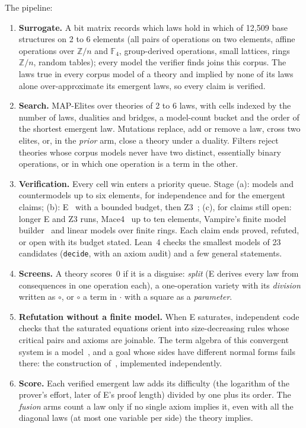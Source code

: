 \documentclass[11pt]{article}
\newcommand{\op}{\cdot}
\newcommand{\cop}{\circ}
\newenvironment{steps}{\begin{enumerate}\setlength{\itemsep}{2pt}\setlength{\parsep}{0pt}\setlength{\topsep}{3pt}}{\end{enumerate}}
\begin{document}
The pipeline:
\begin{steps}
\item \textbf{Surrogate.} A bit matrix records which laws hold in which of 12{,}509 base structures on 2 to 6
  elements (all pairs of operations on two elements, affine operations over $\mathbb{Z}/n$ and $\mathbb{F}_4$,
  group-derived operations, small lattices, rings $\mathbb{Z}/n$, random tables); every model the verifier finds joins
  this corpus. The laws true in every corpus model of a theory and implied by none of its laws alone over-approximate
  its emergent laws, so every claim is verified.
\item \textbf{Search.} MAP-Elites over theories of 2 to 6 laws, with cells indexed by the number of laws, dualities and
  bridges, a model-count bucket and the order of the shortest emergent law. Mutations replace, add or remove a law,
  cross two elites, or, in the \emph{prior} arm, close a theory under a duality. Filters reject theories whose corpus
  models never have two distinct, essentially binary operations, or in which one operation is a term in the other.
\item \textbf{Verification.} Every cell win enters a priority queue. Stage (a): models and countermodels up to six
  elements, for independence and for the emergent claims; (b): E~\cite{eprover2019} with a bounded budget, then
  Z3~\cite{z3}; (c), for claims still open: longer E and Z3 runs, Mace4~\cite{mace4} up to ten elements, Vampire's
  finite model builder~\cite{vampire} and linear models over finite rings. Each claim ends proved, refuted, or open
  with its budget stated. Lean~4 checks the smallest models of 23 candidates (\texttt{decide}, with an axiom audit)
  and a few general statements.
\item \textbf{Screens.} A theory scores~0 if it is a disguise: \emph{split} (E derives every law from consequences in
  one operation each), a one-operation variety with its \emph{division} written as $\cop$, or $\cop$ a term in $\op$
  with a square as a \emph{parameter}.
\item \textbf{Refutation without a finite model.} When E saturates, independent code checks that the saturated
  equations orient into size-decreasing rules whose critical pairs and axioms are joinable. The term algebra of this
  convergent system is a model~\cite{birkhoff1935,knuthbendix1970}, and a goal whose sides have different normal forms
  fails there: the construction of~\cite{janota2026}, implemented independently.
\item \textbf{Score.} Each verified emergent law adds its difficulty (the logarithm of the prover's effort, later of
  E's proof length) divided by one plus its order. The \emph{fusion} arms count a law only if no single axiom implies
  it, even with all the diagonal laws (at most one variable per side) the theory implies.
\end{steps}
\end{document}
